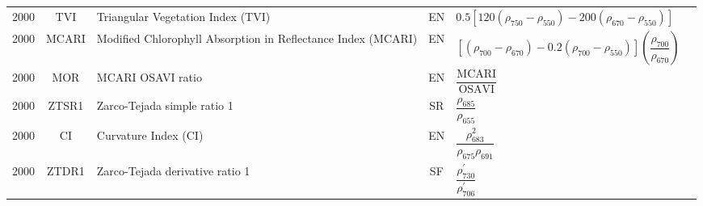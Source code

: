 \documentclass[10pt]{article}
\begin{document}
\begin{ThreePartTable}
\begin{longtable}{c c m{2.3in} c M{2.8in} M{1.5in}}
  2000 & TVI     & Triangular Vegetation Index (TVI)                                              & EN & $0.5[120(\rho_{750}-\rho_{550})-200(\rho_{670}-\rho_{550})]$                                                                                                                                                                                                                            & \citet{Broge2000}                                   \\
  2000 & MCARI   & Modified Chlorophyll Absorption in Reflectance Index (MCARI)                   & EN & $\left[(\rho_{700}-\rho_{670})-0.2(\rho_{700}-\rho_{550})\right]\left(\dfrac{\rho_{700}}{\rho_{670}}\right)$                                                                                                                                                                            & \citet{Daughtry2000}                                \\
  2000 & MOR     & MCARI OSAVI ratio                                                              & EN & $\dfrac{\text{MCARI}}{\text{OSAVI}}$                                                                                                                                                                                                                                                    & \citet{Daughtry2000}                                \\
  2000 & ZTSR1   & Zarco-Tejada simple ratio 1                                                    & SR & $\dfrac{\rho_{685}}{\rho_{655}}$                                                                                                                                                                                                                                                        & \citet{Zarco-Tejada2000a,Zarco-Tejada2000b}         \\
  2000 & CI      & Curvature Index (CI)                                                           & EN & $\dfrac{\rho_{683}^2}{\rho_{675}\rho_{691}}$                                                                                                                                                                                                                                            & \citet{Zarco-Tejada2000a,Zarco-Tejada2000b}         \\
  2000 & ZTDR1   & Zarco-Tejada derivative ratio 1                                                & SF & $\dfrac{\rho^\prime_{730}}{\rho^\prime_{706}}$                                                                                                                                                                                                                                          & \citet{Zarco-Tejada2000b}                           \\

\end{longtable}
\end{ThreePartTable}
\end{document}
